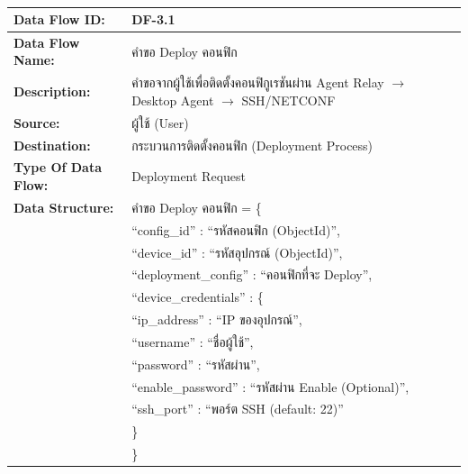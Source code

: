 \begin{table}[H]
    \caption{}
    \label{tab:df-3-1}
    \fontSixTeen 
    \begin{tabularx}{\textwidth}{|l|L|} 
        \hline
        \textbf{Data Flow ID:} & DF-3.1 \\
        \hline
        \textbf{Data Flow Name:} & คำขอ Deploy คอนฟิก \\
        \hline
        \textbf{Description:} & คำขอจากผู้ใช้เพื่อติดตั้งคอนฟิกูเรชันผ่าน Agent Relay $\rightarrow$ Desktop Agent $\rightarrow$ SSH/NETCONF \\
        \hline
        \textbf{Source:} & ผู้ใช้ (User) \\
        \hline
        \textbf{Destination:} & กระบวนการติดตั้งคอนฟิก (Deployment Process) \\
        \hline
        \textbf{Type Of Data Flow:} & Deployment Request \\
        \hline
        \textbf{Data Structure:} & คำขอ Deploy คอนฟิก = \{ \nonumber \\
                        & \hspace{1em} ``config\_id'' : ``รหัสคอนฟิก (ObjectId)'', \nonumber \\
                        & \hspace{1em} ``device\_id'' : ``รหัสอุปกรณ์ (ObjectId)'', \nonumber \\
                        & \hspace{1em} ``deployment\_config'' : ``คอนฟิกที่จะ Deploy'', \nonumber \\
                        & \hspace{1em} ``device\_credentials'' : \{ \nonumber \\
                        & \hspace{2em} ``ip\_address'' : ``IP ของอุปกรณ์'', \nonumber \\
                        & \hspace{2em} ``username'' : ``ชื่อผู้ใช้'', \nonumber \\
                        & \hspace{2em} ``password'' : ``รหัสผ่าน'', \nonumber \\
                        & \hspace{2em} ``enable\_password'' : ``รหัสผ่าน Enable (Optional)'', \nonumber \\
                        & \hspace{2em} ``ssh\_port'' : ``พอร์ต SSH (default: 22)'' \nonumber \\
                        & \hspace{1em} \} \nonumber \\
                        & \} \\
        \hline
    \end{tabularx}
\end{table}

